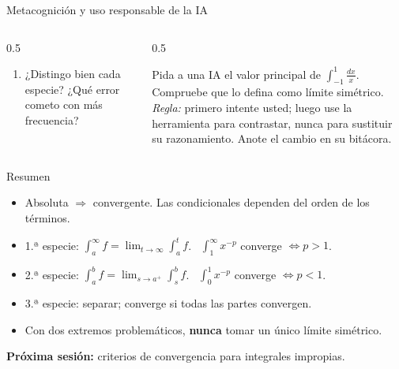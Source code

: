 \documentclass[10pt,aspectratio=169]{beamer}
\begin{document}
\begin{frame}{Metacognición y uso responsable de la IA}
  \small
  \begin{columns}[t]
    \begin{column}{0.5\textwidth}
      \begin{metacog}
        \begin{enumerate}
          \metacomun
          \item ¿Distingo bien cada especie? ¿Qué error cometo con más frecuencia?
        \end{enumerate}
      \end{metacog}
    \end{column}
    \begin{column}{0.5\textwidth}
      \begin{iabox}
        Pida a una IA el valor principal de $\int_{-1}^1\frac{dx}{x}$. Compruebe que lo defina como límite simétrico.\\[2pt]
        \textit{Regla:} primero intente usted; luego use la herramienta para contrastar, nunca para sustituir su razonamiento. Anote el cambio en su bitácora.
      \end{iabox}
    \end{column}
  \end{columns}
\end{frame}

\begin{frame}{Resumen}
  \begin{itemize}
    \item Absoluta $\Rightarrow$ convergente. Las condicionales dependen del orden de los términos.
    \item 1.ª especie: $\int_a^\infty f=\lim_{t\to\infty}\int_a^tf$. \ $\int_1^\infty x^{-p}$ converge $\iff p>1$.
    \item 2.ª especie: $\int_a^bf=\lim_{s\to a^+}\int_s^bf$. \ $\int_0^1x^{-p}$ converge $\iff p<1$.
    \item 3.ª especie: separar; converge si todas las partes convergen.
    \item Con dos extremos problemáticos, \textbf{nunca} tomar un único límite simétrico.
  \end{itemize}
  \vspace{3mm}
  \textbf{Próxima sesión:} criterios de convergencia para integrales impropias.
\end{frame}
\end{document}
